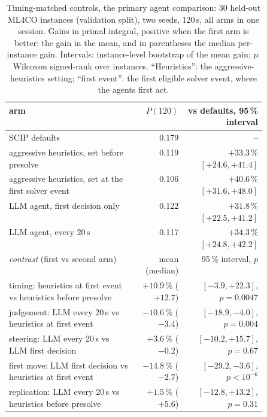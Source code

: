 \begin{table}[t]\centering\small
\begin{tabular}{@{}>{\raggedright\arraybackslash}p{0.50\linewidth}rr@{}}
\toprule
arm & $P(120)$ & vs defaults, 95\,\% interval \\
\midrule
SCIP defaults & 0.179 & -- \\
aggressive heuristics, set before presolve & 0.119 & $+33.3$\,\% $[+24.6, +41.4]$ \\
aggressive heuristics, set at the first solver event & 0.106 & $+40.6$\,\% $[+31.6, +48.0]$ \\
LLM agent, first decision only & 0.122 & $+31.8$\,\% $[+22.5, +41.2]$ \\
LLM agent, every 20\,s & 0.117 & $+34.3$\,\% $[+24.8, +42.2]$ \\
\midrule
\emph{contrast} (first vs second arm) & mean (median) & 95\,\% interval, $p$ \\
\midrule
timing: heuristics at first event vs heuristics before presolve & $+10.9$\,\% ($+12.7$) & $[-3.9, +22.3]$, $p=0.0047$ \\
judgement: LLM every 20\,s vs heuristics at first event & $-10.6$\,\% ($-3.4$) & $[-18.9, -4.0]$, $p=0.004$ \\
steering: LLM every 20\,s vs LLM first decision & $+3.6$\,\% ($-0.2$) & $[-10.2, +15.7]$, $p=0.67$ \\
first move: LLM first decision vs heuristics at first event & $-14.8$\,\% ($-2.7$) & $[-29.2, -3.6]$, $p<10^{-6}$ \\
replication: LLM every 20\,s vs heuristics before presolve & $+1.5$\,\% ($+5.6$) & $[-12.8, +13.2]$, $p=0.31$ \\
\bottomrule
\end{tabular}
\caption{Timing-matched controls, the primary agent comparison: 30 held-out ML4CO instances (validation split), two seeds, 120\,s, all arms in one session. Gains in primal integral, positive when the first arm is better: the gain in the mean, and in parentheses the median per-instance gain. Intervals: instance-level bootstrap of the mean gain; $p$: Wilcoxon signed-rank over instances. ``Heuristics'': the aggressive-heuristics setting; ``first event'': the first eligible solver event, where the agents first act.}\label{tab:timing}
\end{table}